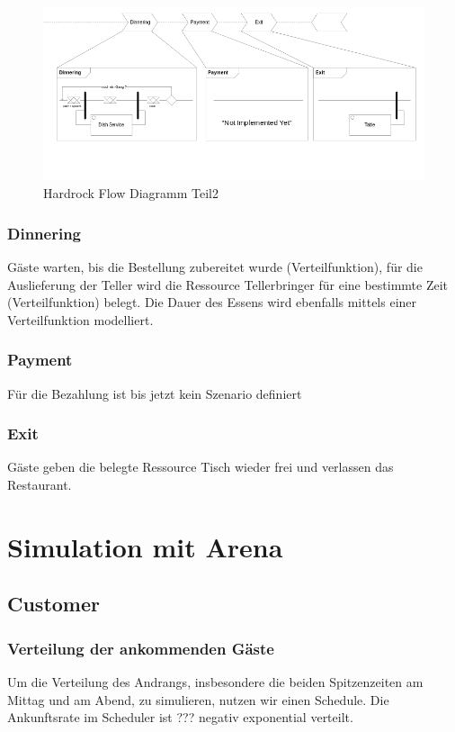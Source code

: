 \documentclass[ngerman,a4paper,12pt]{scrreprt}
\begin{document}
\begin{landscape}
		
		\begin{figure}[H]
				\includegraphics[width=1.4\textwidth]{img/flowDiagramm2-v1.png}
				\caption[Hardrock Flow Diagramm Teil2]{Hardrock Flow Diagramm Teil2}
				\label{flowDiagramm2}
		\end{figure}
		
		\subsection{Dinnering}
		Gäste warten, bis die Bestellung zubereitet wurde (Verteilfunktion), für die Auslieferung der Teller wird die Ressource Tellerbringer für eine bestimmte Zeit (Verteilfunktion) belegt. Die Dauer des Essens wird ebenfalls mittels einer Verteilfunktion modelliert.
		
		\subsection{Payment}
		Für die Bezahlung ist bis jetzt kein Szenario definiert
		
		\subsection{Exit}
		Gäste geben die belegte Ressource Tisch wieder frei und verlassen das Restaurant.
		
\end{landscape}



\chapter{Simulation mit Arena}
	\section{Customer}			
		\subsection{Verteilung der ankommenden Gäste}
			Um die Verteilung des Andrangs, insbesondere die beiden Spitzenzeiten am Mittag und am Abend, zu simulieren, nutzen wir einen Schedule.	
			Die Ankunftsrate im Scheduler ist ??? negativ exponential verteilt.
	
\end{document}
